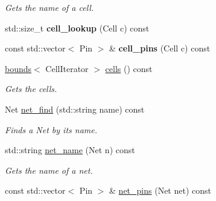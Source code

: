 \begin{DoxyCompactItemize}
\begin{DoxyCompactList}\small\item\em Gets the name of a cell. \end{DoxyCompactList}\item 
\hypertarget{classophidian_1_1timingdriven__placement_1_1timingdriven__placement_a848f5249103a6ff029dc13d22410cef9}{std\-::size\-\_\-t {\bfseries cell\-\_\-lookup} (Cell c) const }\label{classophidian_1_1timingdriven__placement_1_1timingdriven__placement_a848f5249103a6ff029dc13d22410cef9}

\item 
\hypertarget{classophidian_1_1timingdriven__placement_1_1timingdriven__placement_af92078dc67a498243960f5e21f127a52}{const std\-::vector$<$ Pin $>$ \& {\bfseries cell\-\_\-pins} (Cell c) const }\label{classophidian_1_1timingdriven__placement_1_1timingdriven__placement_af92078dc67a498243960f5e21f127a52}

\item 
\hyperlink{structophidian_1_1timingdriven__placement_1_1bounds}{bounds}$<$ Cell\-Iterator $>$ \hyperlink{classophidian_1_1timingdriven__placement_1_1timingdriven__placement_ae0965d132300319bd2e88d9a5cb62e34}{cells} () const 
\begin{DoxyCompactList}\small\item\em Gets the cells. \end{DoxyCompactList}\item 
Net \hyperlink{classophidian_1_1timingdriven__placement_1_1timingdriven__placement_aa52e8805ef88d8ff565387c5c095f3a2}{net\-\_\-find} (std\-::string name) const 
\begin{DoxyCompactList}\small\item\em Finds a Net by its name. \end{DoxyCompactList}\item 
\hypertarget{classophidian_1_1timingdriven__placement_1_1timingdriven__placement_aa1d834e036fff7913c1fd7d5a299240a}{std\-::string \hyperlink{classophidian_1_1timingdriven__placement_1_1timingdriven__placement_aa1d834e036fff7913c1fd7d5a299240a}{net\-\_\-name} (Net n) const }\label{classophidian_1_1timingdriven__placement_1_1timingdriven__placement_aa1d834e036fff7913c1fd7d5a299240a}

\begin{DoxyCompactList}\small\item\em Gets the name of a net. \end{DoxyCompactList}\item 
\hypertarget{classophidian_1_1timingdriven__placement_1_1timingdriven__placement_a958405bda3fb6aaf373d08be7c62919b}{const std\-::vector$<$ Pin $>$ \& \hyperlink{classophidian_1_1timingdriven__placement_1_1timingdriven__placement_a958405bda3fb6aaf373d08be7c62919b}{net\-\_\-pins} (Net net) const }\label{classophidian_1_1timingdriven__placement_1_1timingdriven__placement_a958405bda3fb6aaf373d08be7c62919b}


\end{DoxyCompactItemize}

